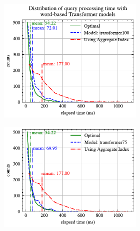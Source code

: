 \documentclass[conference]{IEEEtran}
\begin{document}
\begin{figure}[p]
	\centering
	\begin{subfigure}{0.45\textwidth}
		\begin{subfigure}{\textwidth}
			\centering
			\includegraphics[]{graphics/perf_dist_transformer100_B.pdf}
		\end{subfigure}
		\vfill
		\begin{subfigure}{\textwidth}
			\centering
			\includegraphics[]{graphics/perf_dist_transformer75_B.pdf}
		\end{subfigure}
		\vfill
		\begin{subfigure}{\textwidth}
			\centering

\end{subfigure}
\end{subfigure}
\end{figure}
\end{document}
